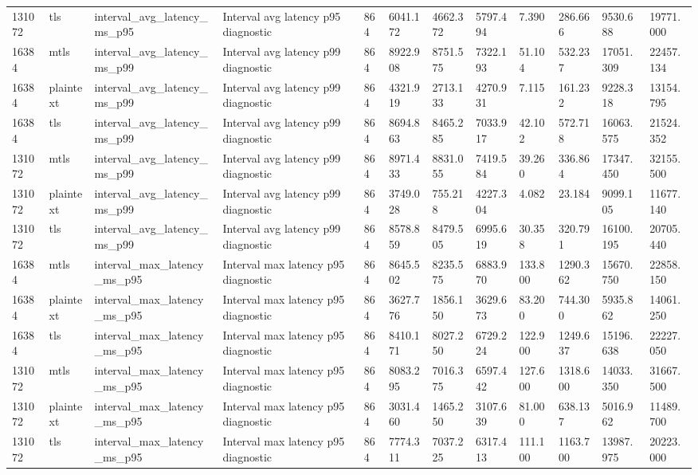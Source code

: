 \begin{longtable}{llllllllllll}
131072 & tls & interval\_avg\_latency\_ms\_p95 & Interval avg latency p95 diagnostic & 864 & 6041.172 & 4662.372 & 5797.494 & 7.390 & 286.666 & 9530.688 & 19771.000 \\
16384 & mtls & interval\_avg\_latency\_ms\_p99 & Interval avg latency p99 diagnostic & 864 & 8922.908 & 8751.575 & 7322.193 & 51.104 & 532.237 & 17051.309 & 22457.134 \\
16384 & plaintext & interval\_avg\_latency\_ms\_p99 & Interval avg latency p99 diagnostic & 864 & 4321.919 & 2713.133 & 4270.931 & 7.115 & 161.232 & 9228.318 & 13154.795 \\
16384 & tls & interval\_avg\_latency\_ms\_p99 & Interval avg latency p99 diagnostic & 864 & 8694.863 & 8465.285 & 7033.917 & 42.102 & 572.718 & 16063.575 & 21524.352 \\
131072 & mtls & interval\_avg\_latency\_ms\_p99 & Interval avg latency p99 diagnostic & 864 & 8971.433 & 8831.055 & 7419.584 & 39.260 & 336.864 & 17347.450 & 32155.500 \\
131072 & plaintext & interval\_avg\_latency\_ms\_p99 & Interval avg latency p99 diagnostic & 864 & 3749.028 & 755.218 & 4227.304 & 4.082 & 23.184 & 9099.105 & 11677.140 \\
131072 & tls & interval\_avg\_latency\_ms\_p99 & Interval avg latency p99 diagnostic & 864 & 8578.859 & 8479.505 & 6995.619 & 30.358 & 320.791 & 16100.195 & 20705.440 \\
16384 & mtls & interval\_max\_latency\_ms\_p95 & Interval max latency p95 diagnostic & 864 & 8645.502 & 8235.575 & 6883.970 & 133.800 & 1290.362 & 15670.750 & 22858.150 \\
16384 & plaintext & interval\_max\_latency\_ms\_p95 & Interval max latency p95 diagnostic & 864 & 3627.776 & 1856.150 & 3629.673 & 83.200 & 744.300 & 5935.862 & 14061.250 \\
16384 & tls & interval\_max\_latency\_ms\_p95 & Interval max latency p95 diagnostic & 864 & 8410.171 & 8027.250 & 6729.224 & 122.900 & 1249.637 & 15196.638 & 22227.050 \\
131072 & mtls & interval\_max\_latency\_ms\_p95 & Interval max latency p95 diagnostic & 864 & 8083.295 & 7016.375 & 6597.442 & 127.600 & 1318.600 & 14033.350 & 31667.500 \\
131072 & plaintext & interval\_max\_latency\_ms\_p95 & Interval max latency p95 diagnostic & 864 & 3031.460 & 1465.250 & 3107.639 & 81.000 & 638.137 & 5016.962 & 11489.700 \\
131072 & tls & interval\_max\_latency\_ms\_p95 & Interval max latency p95 diagnostic & 864 & 7774.311 & 7037.225 & 6317.413 & 111.100 & 1163.700 & 13987.975 & 20223.000 \\

\end{longtable}
